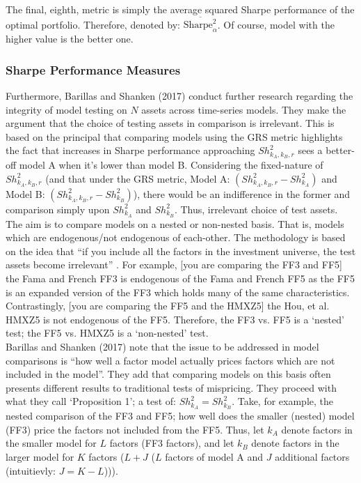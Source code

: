 \documentclass[11pt, english]{article}
\begin{document}
	The final, eighth, metric is simply the average squared Sharpe performance of the optimal portfolio. Therefore, denoted by: $\overline{\textrm{Sharpe}_{\alpha}^2}$. Of course, model with the higher value is the better one.

		\subsubsection*{Sharpe Performance Measures}

	Furthermore, Barillas and Shanken (2017) conduct further research regarding the integrity of model testing on $N$ assets across time-series models. They make the argument that the choice of testing assets in comparison is irrelevant. This is based on the principal that comparing models using the GRS metric highlights the fact that increases in Sharpe performance approaching $Sh_{k_{A},k_{B},r}^2$ sees a better-off model A when it's lower than model B. Considering the fixed-nature of $Sh_{k_{A},k_{B},r}^2$ (and that under the GRS metric, Model A: $(Sh_{k_{A},k_{B},r}^2-Sh_{k_{A}}^2)$ and Model B: $(Sh_{k_{A},k_{B},r}^2-Sh_{k_{B}}^2)$), there would be an indifference in the former and comparison simply upon $Sh_{k_{A}}^2$ and $Sh_{k_{B}}^2$. Thus, irrelevant choice of test assets.\\

	The aim is to compare models on a nested or non-nested basis. That is, models which are endogenous/not endogenous of each-other. The methodology is based on the idea that ``if you include all the factors in the investment universe, the test assets become irrelevant'' . For example, [you are comparing the FF3 and FF5] the Fama and French FF3 is endogenous of the Fama and French FF5 as the FF5 is an expanded version of the FF3 which holds many of the same characteristics. Contrastingly, [you are comparing the FF5 and the HMXZ5] the Hou, et al. HMXZ5 is not endogenous of the FF5. Therefore, the FF3 vs. FF5 is a `nested' test; the FF5 vs. HMXZ5 is a `non-nested' test.\\

	Barillas and Shanken (2017) note that the issue to be addressed in model comparisons is ``how well a factor model actually prices factors which are not included in the model''. They add that comparing models on this basis often presents different results to traditional tests of mispricing. They proceed with what they call `Proposition 1'; a test of: $Sh_{k_{A}}^2=Sh_{k_{B}}^2$. Take, for example, the nested comparison of the FF3 and FF5; how well does the smaller (nested) model (FF3) price the factors not included from the FF5. Thus, let $k_A$ denote factors in the smaller model for $L$ factors (FF3 factors), and let $k_B$ denote factors in the larger model for $K$ factors ($L+J$ ($L$ factors of model A and $J$ additional factors (intuitievly: $J=K-L$))).\\
\end{document}
